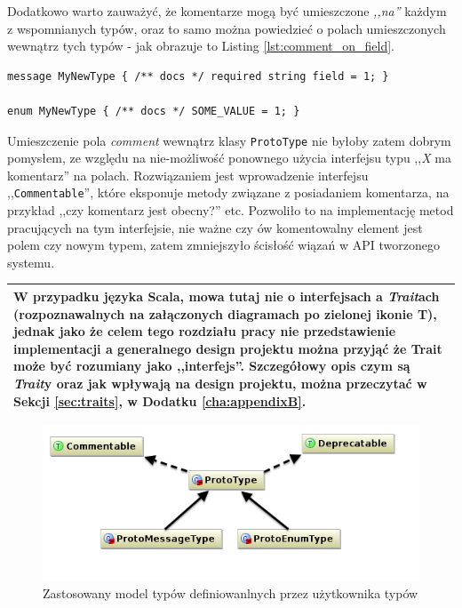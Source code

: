 \documentclass[pdflatex,11pt]{aghdpl}
\begin{document}
Dodatkowo warto zauważyć, że komentarze mogą być umieszczone \textit{,,na''} każdym z wspomnianych typów,
oraz to samo można powiedzieć o polach umieszczonych wewnątrz tych typów - jak obrazuje to Listing \ref{lst:comment_on_field}.

\begin{lstlisting}[caption = {Przykład umieszczenia komentarza ProtoDoc na polach wiadomości oraz enumeracji}, label = {lst:comment_on_field}]
message MyNewType { /** docs */ required string field = 1; }

enum MyNewType { /** docs */ SOME_VALUE = 1; }
\end{lstlisting}

Umieszczenie pola \textit{comment} wewnątrz klasy \verb|ProtoType| nie byłoby zatem dobrym pomysłem, ze względu na nie-możliwość ponownego użycia 
interfejsu typu ,,\textit{X} ma komentarz'' na polach. Rozwiązaniem jest wprowadzenie interfejsu ,,\verb|Commentable|'', które eksponuje metody związane
z posiadaniem komentarza, na przykład ,,czy komentarz jest obecny?'' etc. Pozwoliło to na implementację metod pracujących na tym interfejsie, 
nie ważne czy ów komentowalny element jest polem czy nowym typem, zatem zmniejszyło ścisłość wiązań w API tworzonego systemu. 

\begin{center}
\begin{tabular}{|p{\textwidth}|}
\hline
W przypadku języka Scala, mowa tutaj nie o interfejsach a \textit{Trait}ach (rozpoznawalnych na załączonych diagramach po zielonej ikonie \textbf{T}), 
jednak jako że celem tego rozdziału pracy nie przedstawienie implementacji a generalnego design projektu można przyjąć że Trait może być rozumiany
jako ,,interfejs''. Szczegółowy opis czym są \textit{Trait}y oraz jak wpływają na design projektu, można przeczytać w Sekcji \ref{sec:traits}, w Dodatku \ref{cha:appendixB}.
\\ \hline
\end{tabular}
\end{center}

\begin{figure}[ch]
\begin{center}
 \includegraphics[width=\textwidth]{proto_types}
\end{center}
\label{fig:types_diagram}
\caption{Zastosowany model typów definiowanlnych przez użytkownika typów}
\end{figure}
\end{document}
